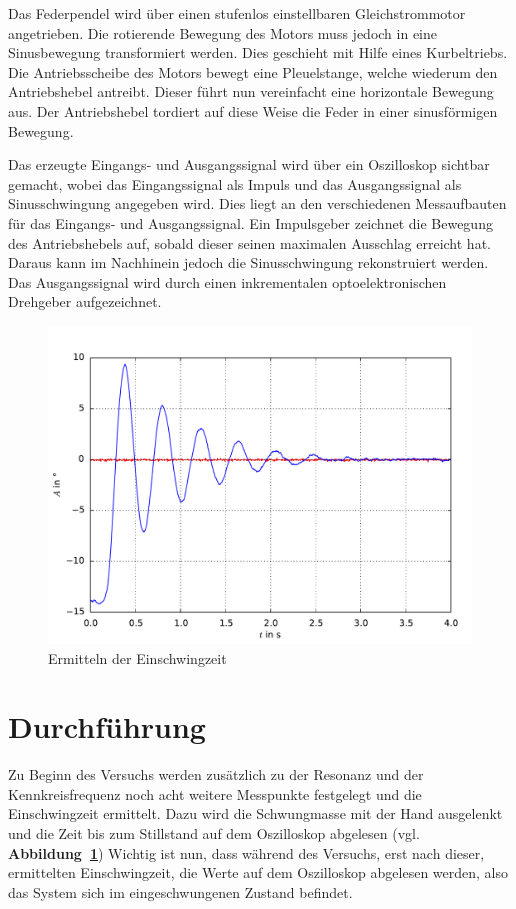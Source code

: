\documentclass[a4paper,12pt]{scrartcl}
\begin{document}
Das Federpendel wird über einen stufenlos einstellbaren Gleichstrommotor angetrieben. Die rotierende Bewegung des Motors muss jedoch in eine
Sinusbewegung transformiert werden. Dies geschieht mit Hilfe eines Kurbeltriebs. Die Antriebsscheibe des Motors bewegt eine Pleuelstange,
welche wiederum den Antriebshebel antreibt. Dieser führt nun vereinfacht eine horizontale Bewegung aus.
Der Antriebshebel tordiert auf diese Weise die Feder in einer sinusförmigen Bewegung.

Das erzeugte Eingangs- und Ausgangssignal wird über ein Oszilloskop sichtbar gemacht, wobei das Eingangssignal als Impuls und das Ausgangssignal
als Sinusschwingung angegeben wird. Dies liegt an den verschiedenen Messaufbauten für das Eingangs- und Ausgangssignal. Ein Impulsgeber zeichnet
die Bewegung des Antriebshebels auf, sobald dieser seinen maximalen Ausschlag erreicht hat. Daraus kann im Nachhinein jedoch die Sinusschwingung
rekonstruiert werden. Das Ausgangssignal wird durch einen inkrementalen optoelektronischen Drehgeber aufgezeichnet.

\begin{figure}[h]
\centering
\includegraphics[width=\textwidth]{ausschwingen.pdf}
\caption{Ermitteln der Einschwingzeit}
\label{fig:plot-ausschwingen}
\end{figure}

\section{Durchführung}
Zu Beginn des Versuchs werden zusätzlich zu der Resonanz und der Kennkreisfrequenz noch acht weitere Messpunkte festgelegt und die Einschwingzeit ermittelt.
Dazu wird die Schwungmasse mit der Hand ausgelenkt und die Zeit bis zum Stillstand auf dem Oszilloskop abgelesen (vgl. \textbf{Abbildung~\ref{fig:plot-ausschwingen}})
Wichtig ist nun, dass während des Versuchs, erst nach dieser, ermittelten Einschwingzeit, die Werte auf dem Oszilloskop abgelesen werden, also das System sich im
eingeschwungenen Zustand befindet.
\end{document}
